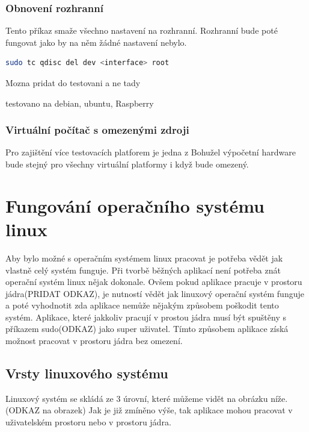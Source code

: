 \subsection*{Obnovení rozhranní}
Tento příkaz smaže všechno nastavení na rozhranní. Rozhranní bude poté fungovat jako by na něm žádné nastavení nebylo.
\begin{lstlisting}[language=bash]
    sudo tc qdisc del dev <interface> root
\end{lstlisting}


Mozna pridat do testovani a ne tady

testovano na debian, ubuntu, Raspberry

\subsection{Virtuální počítač s omezenými zdroji}

Pro zajištění více testovacích platforem je jedna z
Bohužel výpočetní hardware bude stejný pro všechny virtuální platformy i když bude omezený.

\chapter{Fungování operačního systému linux}

Aby bylo možné s operačním systémem linux pracovat je potřeba vědět jak vlastně celý systém funguje. Při tvorbě běžných aplikací není potřeba
znát operační systém linux nějak dokonale. Ovšem pokud aplikace pracuje v prostoru jádra(PRIDAT ODKAZ), je nutností vědět jak linuxový operační
systém funguje a poté vyhodnotit zda aplikace nemůže nějakým způsobem poškodit tento systém. Aplikace, které jakkoliv pracují v prostou
jádra musí být spuštěny s příkazem sudo(ODKAZ) jako super uživatel. Tímto způsobem aplikace získá možnost pracovat v prostoru jádra bez
omezení.

\section{Vrsty linuxového systému}

Linuxový systém se skládá ze 3 úrovní, které můžeme vidět na obrázku níže.(ODKAZ na obrazek)
Jak je již zmíněno výše, tak aplikace mohou pracovat v uživatelském prostoru nebo v prostoru jádra.

